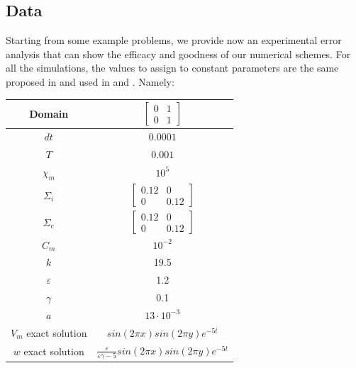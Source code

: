 \documentclass[a4paper,11pt]{article}
\begin{document}
\subsection{Data}
Starting from some example problems, we provide now an experimental error analysis that can show the efficacy and goodness of our numerical schemes. For all the simulations, the values to assign to constant parameters are the same proposed in \cite{bagnara} and used in \cite{andreotti} and \cite{marta}. Namely:
\begin{center}
	\begin{tabular}{|c|c|} 
		\hline 
		\rule[-4mm]{0mm}{1cm}
		Domain & $\begin{bmatrix} 0 & 1 \\ 0 & 1 \end{bmatrix}$ \\
		\hline 
		\rule[-4mm]{0mm}{1cm}
		$dt$ & $0.0001$ \\
		\hline
		\rule[-4mm]{0mm}{1cm}
		$T$ & $0.001$ \\
		\hline
		\rule[-4mm]{0mm}{1cm}
		$\chi_m$ & $10^5$ \\
		\hline
		\rule[-4mm]{0mm}{1cm}
		$\Sigma_i$ & $\begin{bmatrix} 0.12 & 0 \\ 0 & 0.12 \end{bmatrix}$ \\
		\hline
		\rule[-4mm]{0mm}{1cm}
		$\Sigma_e$ & $\begin{bmatrix} 0.12 & 0 \\ 0 & 0.12 \end{bmatrix}$ \\
		\hline
		\rule[-4mm]{0mm}{1cm}
		$C_m$ & $10^{-2}$ \\
		\hline
		\rule[-4mm]{0mm}{1cm}
		$k$ & 19.5 \\ 
		\hline
		\rule[-4mm]{0mm}{1cm}
		$\varepsilon$ & 1.2 \\
		\hline
		\rule[-4mm]{0mm}{1cm}
		$\gamma$ & 0.1 \\
		\hline
		\rule[-4mm]{0mm}{1cm}
		$a$ & $13 \cdot 10^{-3}$ \\
		\hline
		\rule[-4mm]{0mm}{1cm}
		$V_m$ exact solution & $sin(2 \pi x) sin(2 \pi y) e^{-5 t}$ \\
		\hline
		\rule[-4mm]{0mm}{1cm}
		$w$ exact solution & $\frac{\varepsilon}{\varepsilon \gamma-5} sin(2 \pi x) sin(2 \pi y) e^{-5 t}$ \\
		\hline
		
	\end{tabular}
\end{center}
\end{document}
